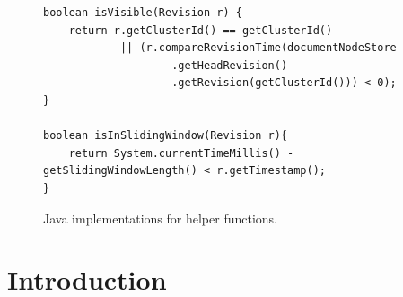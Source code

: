 \documentclass[abstracton,12pt]{scrreprt}
\begin{document}
\begin{figure}[h]
    \begin{framed}
        \begin{scriptsize}
            \begin{verbatim}
boolean isVisible(Revision r) {
    return r.getClusterId() == getClusterId()
            || (r.compareRevisionTime(documentNodeStore
                    .getHeadRevision()
                    .getRevision(getClusterId())) < 0);
}

boolean isInSlidingWindow(Revision r){
    return System.currentTimeMillis() - getSlidingWindowLength() < r.getTimestamp();
}
            \end{verbatim}
        \end{scriptsize}
    \end{framed}
    \caption{Java implementations for helper functions.}
    \label{algo:helper_functions}
\end{figure}




















\newpage
\newpage

\chapter{Introduction}
 
\end{document}
